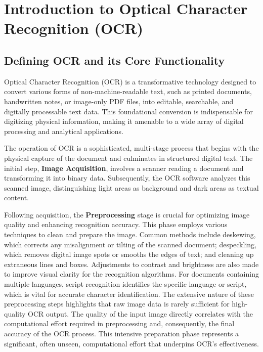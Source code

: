 \section{Introduction to Optical Character Recognition (OCR)}
\label{sec:intro-ocr}

\subsection{Defining OCR and its Core Functionality}

Optical Character Recognition (OCR) is a transformative technology designed to convert various forms of non-machine-readable text, such as printed documents, handwritten notes, or image-only PDF files, into editable, searchable, and digitally processable text data.\cite{AWSOCR}\cite{AdobeOCR} This foundational conversion is indispensable for digitizing physical information, making it amenable to a wide array of digital processing and analytical applications.

The operation of OCR is a sophisticated, multi-stage process that begins with the physical capture of the document and culminates in structured digital text. The initial step, \textbf{Image Acquisition}, involves a scanner reading a document and transforming it into binary data. Subsequently, the OCR software analyzes this scanned image, distinguishing light areas as background and dark areas as textual content.

Following acquisition, the \textbf{Preprocessing} stage is crucial for optimizing image quality and enhancing recognition accuracy. This phase employs various techniques to clean and prepare the image. Common methods include deskewing, which corrects any misalignment or tilting of the scanned document; despeckling, which removes digital image spots or smooths the edges of text; and cleaning up extraneous lines and boxes. Adjustments to contrast and brightness are also made to improve visual clarity for the recognition algorithms. For documents containing multiple languages, script recognition identifies the specific language or script, which is vital for accurate character identification. The extensive nature of these preprocessing steps highlights that raw image data is rarely sufficient for high-quality OCR output. The quality of the input image directly correlates with the computational effort required in preprocessing and, consequently, the final accuracy of the OCR process. This intensive preparation phase represents a significant, often unseen, computational effort that underpins OCR's effectiveness.


